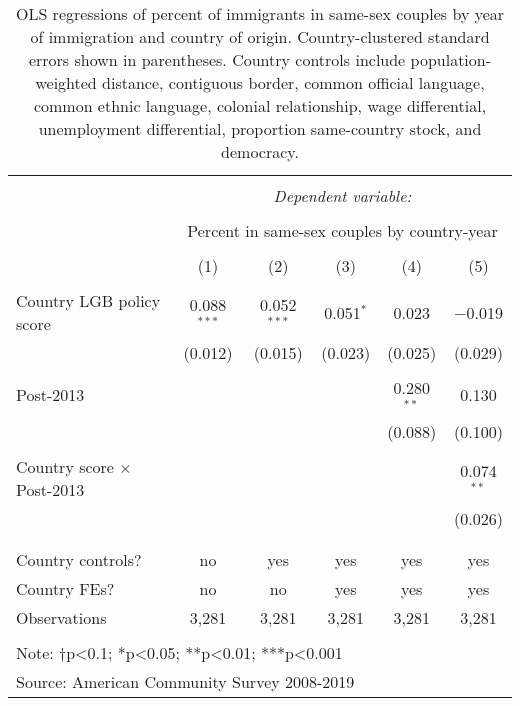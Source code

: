 \documentclass[
  11pt,
]{article}
\begin{document}
\begin{table}[!htbp] \centering 
  \caption{OLS regressions of percent of immigrants in same-sex couples by year of immigration and country of origin. Country-clustered standard errors shown in parentheses. Country controls include population-weighted distance, contiguous border, common official language, common ethnic language, colonial relationship, wage differential, unemployment differential, proportion same-country stock, and democracy.} 
  \label{tab:country-props} 
\begin{tabular}{@{\extracolsep{5pt}}lccccc} 
\\[-1.8ex]\hline 
\hline \\[-1.8ex] 
 & \multicolumn{5}{c}{\textit{Dependent variable:}} \\ 
\cline{2-6} 
\\[-1.8ex] & \multicolumn{5}{c}{Percent in same-sex couples by country-year} \\ 
\\[-1.8ex] & (1) & (2) & (3) & (4) & (5)\\ 
\hline \\[-1.8ex] 
 Country LGB policy score & 0.088$^{***}$ & 0.052$^{***}$ & 0.051$^{*}$ & 0.023 & $-$0.019 \\ 
  & (0.012) & (0.015) & (0.023) & (0.025) & (0.029) \\ 
  & & & & & \\ 
 Post-2013 &  &  &  & 0.280$^{**}$ & 0.130 \\ 
  &  &  &  & (0.088) & (0.100) \\ 
  & & & & & \\ 
 Country score × Post-2013 &  &  &  &  & 0.074$^{**}$ \\ 
  &  &  &  &  & (0.026) \\ 
  & & & & & \\ 
\hline \\[-1.8ex] 
Country controls? & no & yes & yes & yes & yes \\ 
Country FEs? & no & no & yes & yes & yes \\ 
Observations & 3,281 & 3,281 & 3,281 & 3,281 & 3,281 \\ 
\hline 
\hline \\[-1.8ex] 
\multicolumn{6}{l}{Note: †p<0.1; *p<0.05; **p<0.01; ***p<0.001} \\ 
\multicolumn{6}{l}{Source: American Community Survey 2008-2019} \\ 
\end{tabular} 
\end{table}
\end{document}
